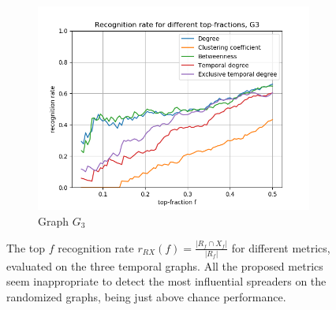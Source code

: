 \documentclass[letterpaper]{article}
\begin{document}
\begin{figure}
\begin{subfigure}[b]{0.32\textwidth}
        \includegraphics[width=\textwidth]{img/rankG3.png}
        \caption{Graph \(G_3\)}
	    \label{fig:recognition_rates_G3}
    \end{subfigure}
    \caption{\small{The top $f$ recognition rate $r_{RX}(f) = \frac{ |R_f \cap X_f| }{ |R_f| }$ for different metrics, evaluated on the three temporal graphs. All the proposed metrics seem inappropriate to detect the most influential spreaders on the randomized graphs, being just above chance performance.}}
    \label{fig:recognition_rates}
	
	\bigskip
	

\end{figure}
\end{document}
